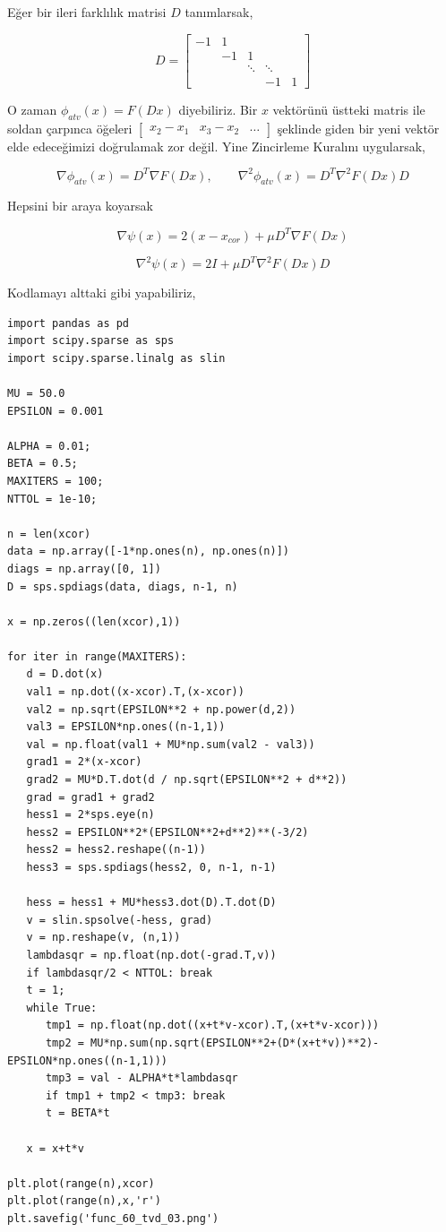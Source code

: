 \documentclass[12pt,fleqn]{article}\usepackage{../../common}
\begin{document}
Eğer bir ileri farklılık matrisi $D$ tanımlarsak, 

$$
D = \left[\begin{array}{ccccc}
-1  & 1 & & &    \\
 & -1 & 1 & &   \\
 &  & \ddots  & \ddots &  \\
 &  &  &  -1 & 1
\end{array}\right]
$$

O zaman $\phi_{atv}(x) = F(Dx)$ diyebiliriz. Bir $x$ vektörünü
üstteki matris ile soldan çarpınca öğeleri 
$\left[\begin{array}{ccc} x_2-x_1 & x_3-x_2 & \dots \end{array}\right]$ 
şeklinde giden bir yeni vektör elde edeceğimizi doğrulamak zor değil. Yine
Zincirleme Kuralını uygularsak,

$$
\nabla \phi_{atv}(x) = D^T \nabla F(Dx), \qquad
\nabla^2 \phi_{atv}(x) = D^T \nabla^2 F(Dx) D
$$

Hepsini bir araya koyarsak 

$$
\nabla \psi(x) = 2(x-x_{cor}) + \mu D^T \nabla F(Dx)
$$

$$
\nabla^2 \psi(x) = 2 I  + \mu D^T \nabla^2 F(Dx) D
$$

Kodlamayı alttaki gibi yapabiliriz,

\begin{verbatim}
import pandas as pd
import scipy.sparse as sps
import scipy.sparse.linalg as slin

MU = 50.0
EPSILON = 0.001

ALPHA = 0.01;
BETA = 0.5;
MAXITERS = 100;
NTTOL = 1e-10;

n = len(xcor)
data = np.array([-1*np.ones(n), np.ones(n)])
diags = np.array([0, 1])
D = sps.spdiags(data, diags, n-1, n)

x = np.zeros((len(xcor),1))

for iter in range(MAXITERS):
   d = D.dot(x)
   val1 = np.dot((x-xcor).T,(x-xcor))
   val2 = np.sqrt(EPSILON**2 + np.power(d,2))
   val3 = EPSILON*np.ones((n-1,1))
   val = np.float(val1 + MU*np.sum(val2 - val3))
   grad1 = 2*(x-xcor)
   grad2 = MU*D.T.dot(d / np.sqrt(EPSILON**2 + d**2))
   grad = grad1 + grad2
   hess1 = 2*sps.eye(n)
   hess2 = EPSILON**2*(EPSILON**2+d**2)**(-3/2)
   hess2 = hess2.reshape((n-1))
   hess3 = sps.spdiags(hess2, 0, n-1, n-1)

   hess = hess1 + MU*hess3.dot(D).T.dot(D)
   v = slin.spsolve(-hess, grad)
   v = np.reshape(v, (n,1))
   lambdasqr = np.float(np.dot(-grad.T,v))
   if lambdasqr/2 < NTTOL: break
   t = 1;
   while True:
      tmp1 = np.float(np.dot((x+t*v-xcor).T,(x+t*v-xcor)))
      tmp2 = MU*np.sum(np.sqrt(EPSILON**2+(D*(x+t*v))**2)-EPSILON*np.ones((n-1,1)))
      tmp3 = val - ALPHA*t*lambdasqr
      if tmp1 + tmp2 < tmp3: break
      t = BETA*t

   x = x+t*v

plt.plot(range(n),xcor)
plt.plot(range(n),x,'r')
plt.savefig('func_60_tvd_03.png')
\end{verbatim}
\end{document}
